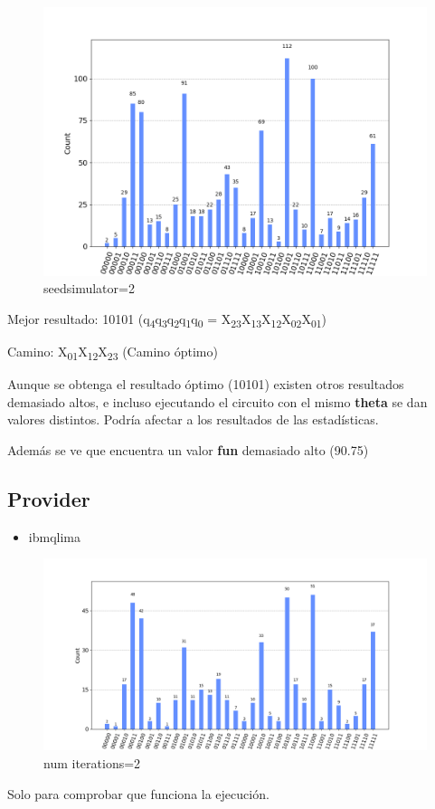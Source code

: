 \documentclass[letterpaper]{article}
\begin{document}
\begin{figure}[htbp]
\centering
\includegraphics[scale=0.5]{./img/primer_restr_aer_correcto-con-ruido.png}
\caption{seed\textunderscore simulator=2}
\end{figure}

Mejor resultado: 10101 (q\textsubscript{4}q\textsubscript{3}q\textsubscript{2}q\textsubscript{1}q\textsubscript{0} = X\textsubscript{23}X\textsubscript{13}X\textsubscript{12}X\textsubscript{02}X\textsubscript{01})

Camino: X\textsubscript{01}X\textsubscript{12}X\textsubscript{23} (Camino óptimo)

Aunque se obtenga el resultado óptimo (10101) existen otros resultados demasiado altos, e incluso ejecutando el circuito con el mismo \textbf{theta} se dan valores distintos. Podría afectar a los resultados de las estadísticas.

Además se ve que encuentra un valor \textbf{fun} demasiado alto (90.75)

\newpage

\subsection{Provider}
\label{sec:org83afeb5}
\begin{itemize}
\item ibmq\textunderscore lima
\end{itemize}
\begin{figure}[htbp]
\centering
\includegraphics[scale=0.4]{./img/primer_provider_iter-2.png}
\caption{num iterations=2}
\end{figure}
Solo para comprobar que funciona la ejecución.
\end{document}
